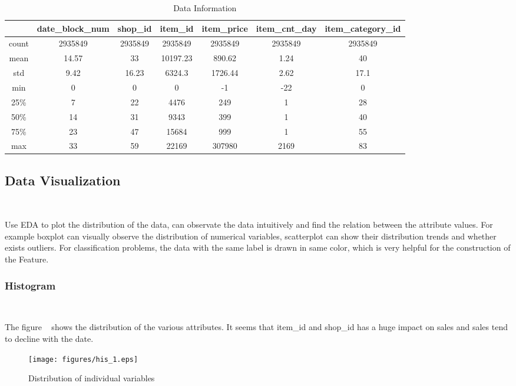 \begin{table}[htbp]  \centering
	\caption{Data Information}
	\label{tbl:data information}
	\begin{tabular}{ccccccc}
		\hline
		& date\_block\_num & shop\_id & item\_id & item\_price & item\_cnt\_day 
		& item\_category\_id\\
		\hline
		count & 2935849 & 2935849 & 2935849 & 2935849 & 2935849 & 2935849 \\
		mean & 14.57 & 33 & 10197.23 & 890.62 & 1.24 & 40 \\
		std & 9.42 & 16.23 & 6324.3 & 1726.44 & 2.62 & 17.1 \\
		min & 0 & 0 & 0 & -1 & -22 & 0 \\
		25\%  & 7 & 22 & 4476 & 249 & 1 & 28 \\
		50\%  & 14 & 31 & 9343 & 399 & 1 & 40\\
		75\% & 23 & 47 & 15684 & 999 & 1 & 55\\
		max & 33 & 59 & 22169 & 307980 & 2169 & 83\\
		\hline 
	\end{tabular}
\end{table}

\subsection{Data Visualization}
\

Use EDA to plot the distribution of the data,
can observate the data intuitively and
find the relation between the attribute values. 
For example boxplot can visually observe 
the distribution of numerical variables, 
scatterplot can show their distribution trends 
and whether exists outliers.
For classification problems, 
the data with the same label is drawn in same color, 
which is very helpful for 
the construction of the Feature.


\subsubsection{ Histogram}
\

The figure ~ 
shows the distribution of the various attributes. It seems that item\_id and 
shop\_id has a huge impact on sales and sales tend to decline with the date.


\begin{figure}[htbp]
	\centering
	
	\texttt{[image: figures/his\_1.eps]}
	\caption{Distribution of individual variables}\label{fig:his_1}
\end{figure}


